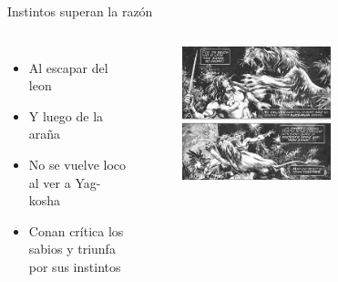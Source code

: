 \begin{frame}{Instintos superan la razón}
\begin{columns}
 \begin{itemize}
    \item Al escapar del leon
    \item Y luego de la araña
    \item No se vuelve loco al ver a Yag-kosha
    \item Conan crítica los sabios y triunfa por sus instintos
 \end{itemize}
 \begin{figure}[htb]
    \centering
    \includegraphics[width=0.6\textwidth]{img/tropes/instintos}
 \end{figure} 
 \end{columns}
\end{frame}

